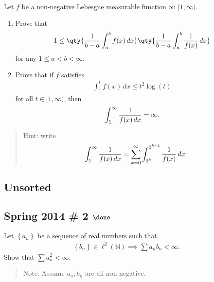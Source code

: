 Let \(f\) be a non-negative Lebesgue measurable function on
\([1, \infty)\).

\begin{enumerate}
\def\labelenumi{\alph{enumi}.}
\item
  Prove that
  \begin{align*}  
  1 \leq \qty{
  {1 \over b-a} \int_a^b f(x) \,dx
  }\qty{
  {1\over b-a} \int_a^b {1 \over f(x)}\, dx
  }
  \end{align*}
  for any \(1\leq a < b <\infty\).
\item
  Prove that if \(f\) satisfies
  \begin{align*}  
  \int_1^t f(x) \, dx \leq t^2 \log(t)
  \end{align*}
  for all \(t\in [1, \infty)\), then
  \begin{align*}  
  \int_1^\infty {1\over f(x) \,dx} = \infty
  .\end{align*}
\end{enumerate}

\begin{quote}
Hint: write
\begin{align*}  
\int_1^\infty {1\over f(x) \, dx} = \sum_{k=0}^\infty \int_{2^k}^{2^{k+1}} {1 \over f(x)}\,dx
.\end{align*}
\end{quote}

\hypertarget{unsorted}{%
\subsection{Unsorted}\label{unsorted}}

\hypertarget{spring-2014-2-done}{%
\subsection{\texorpdfstring{Spring 2014 \# 2
\(\done\)}{Spring 2014 \# 2 \textbackslash done}}\label{spring-2014-2-done}}

Let \(\left\{{a_n}\right\}\) be a sequence of real numbers such that
\begin{align*}
\left\{{b_n}\right\} \in \ell^2({\mathbb{N}}) \implies \sum a_n b_n < \infty.
\end{align*}
Show that \(\sum a_n^2 < \infty\).

\begin{quote}
Note: Assume \(a_n, b_n\) are all non-negative.
\end{quote}


